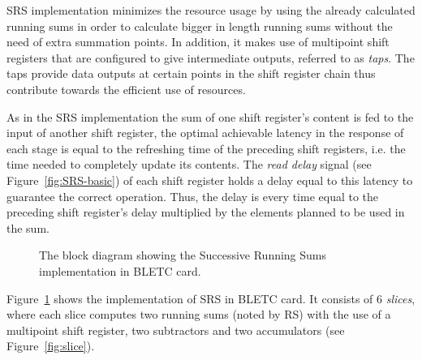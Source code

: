 \documentclass{llncs}
\begin{document}
SRS implementation minimizes the resource usage by using the already calculated running sums in order to calculate bigger in length running sums without the need of extra summation points.
In addition, it makes use of multipoint shift registers that are configured to give intermediate outputs, referred to as \emph{taps}.
The taps provide data outputs at certain points in the shift register chain thus contribute towards the efficient use of resources.

As in the SRS implementation the sum of one shift register's content is fed to the input of another shift register, the optimal achievable latency in the response of each stage is equal to the refreshing time of the preceding shift registers, i.e. the time needed to completely update its contents.
The \emph{read delay} signal (see Figure~\ref{fig:SRS-basic}) of each shift register holds a delay equal to this latency to guarantee the correct operation.
Thus, the delay is every time equal to the preceding shift register's delay multiplied by the elements planned to be used in the sum.

\begin{figure}[t]
  \centering {}
   \caption{The block diagram showing the Successive Running Sums implementation in BLETC card.}
  \label{fig:srs}
\end{figure}


Figure~\ref{fig:srs} shows the implementation of SRS in BLETC card.
It consists of 6 \emph{slices}, where each slice computes two running sums (noted by RS) with the use of a multipoint shift register, two subtractors and two accumulators (see Figure~\ref{fig:slice}).
\end{document}
